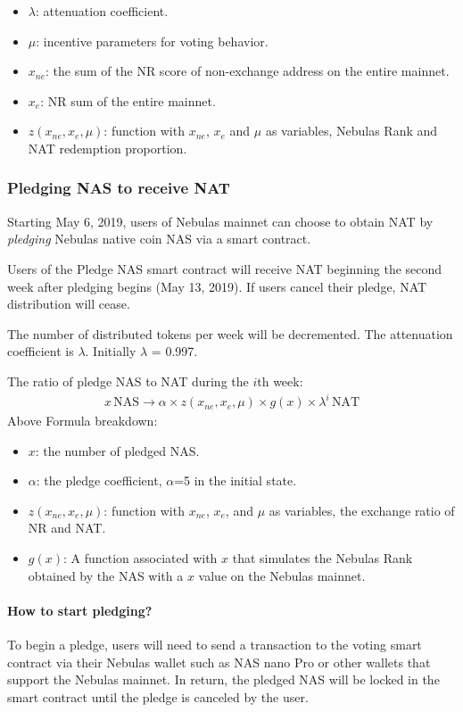 \begin{itemize}
	\item $\lambda$: attenuation coefficient.
	\item $\mu$: incentive parameters for voting behavior.
	\item $x_{ne}$: the sum of the NR score of non-exchange address on the entire mainnet.
	\item $x_{e}$: NR sum of the entire mainnet.
	\item $z(x_{ne},x_{e},\mu)$: function with $x_{ne}$, $x_{e}$ and $\mu$ as variables, Nebulas Rank and NAT redemption proportion.
\end{itemize}

\subsubsection{Pledging NAS to receive NAT}

Starting May 6, 2019, users of Nebulas mainnet can choose to obtain NAT by
\emph{pledging} Nebulas native coin NAS via a smart contract.

Users of the Pledge NAS smart contract will receive NAT beginning the second week after pledging begins (May 13, 2019). If users cancel their pledge, NAT distribution will cease.

The number of distributed tokens per week will be decremented. The attenuation coefficient is $\lambda$. Initially $\lambda$ = 0.997.

The ratio of pledge NAS to NAT during the $i$th week:
\begin{align}
x\,\text{NAS} \rightarrow \alpha \times z(x_{ne},x_{e},\mu)\times g(x) \times
  \lambda^{i}\,\text{NAT}
\end{align}
Above Formula breakdown:

\begin{itemize}
	\item $x$: the number of pledged NAS.
	\item $\alpha$: the pledge coefficient, $\alpha$=5 in the initial state.
	\item $z(x_{ne},x_{e},\mu)$: function with $x_{ne}$, $x_{e}$, and $\mu$ as variables, the exchange ratio of NR and NAT.
	\item $g(x)$: A function associated with $x$ that simulates the Nebulas Rank obtained by the NAS with a $x$ value on the Nebulas mainnet.
\end{itemize}


\paragraph{How to start pledging?}
To begin a pledge, users will need to send a transaction to the voting smart contract via their Nebulas wallet such as NAS nano Pro or other wallets that support the Nebulas mainnet. In return, the pledged NAS will be locked in the smart contract until the pledge is canceled by the user.

